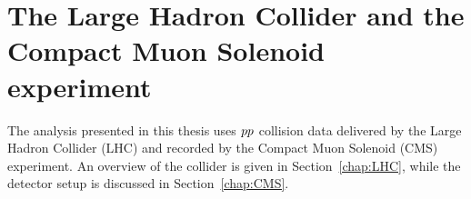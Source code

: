 \chapter{The Large Hadron Collider and the Compact Muon Solenoid experiment \label{chap:LHC_CMS}}

The analysis presented in this thesis uses ${p}{p}$ collision data delivered by the Large Hadron
Collider (LHC) and recorded by the Compact Muon Solenoid (CMS) experiment. An overview of the
collider is given in Section~\ref{chap:LHC}, while the detector setup is discussed in
Section~\ref{chap:CMS}.



